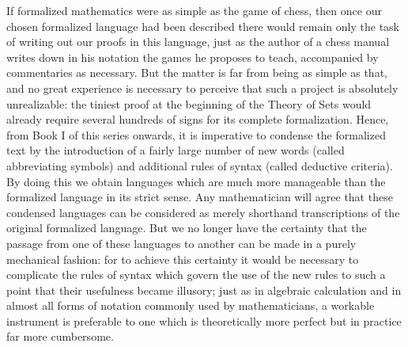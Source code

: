 If formalized mathematics were as simple as the game of chess, then once our chosen formalized language had been described there would remain only the task of writing out our proofs in this language, just as the author of a chess manual writes down in his notation the games he proposes to teach, accompanied by commentaries as necessary. But the matter is far from being as simple as that, and no great experience is necessary to perceive that such a project is absolutely unrealizable: the tiniest proof at the beginning of the Theory of Sets would already require several hundreds of signs for its complete formalization. Hence, from Book I of this series onwards, it is imperative to condense the formalized text by the introduction of a fairly large number of new words (called abbreviating symbols) and additional rules of syntax (called deductive criteria). By doing this we obtain languages which are much more manageable than the formalized language in its strict sense. Any mathematician will agree that these condensed languages can be considered as merely shorthand transcriptions of the original formalized language. But we no longer have the certainty that the passage from one of these languages to another can be made in a purely mechanical fashion: for to achieve this certainty it would be necessary to complicate the rules of syntax which govern the use of the new rules to such a point that their usefulness became illusory; just as in algebraic calculation and in almost all forms of notation commonly used by mathematicians, a workable instrument is preferable to one which is theoretically more perfect but in practice far more cumbersome.

